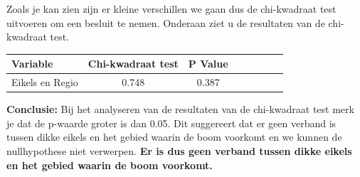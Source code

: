 \documentclass[12pt]{article}
\begin{document}
Zoals je kan zien zijn er  kleine verschillen we gaan dus de chi-kwadraat test uitvoeren om een besluit te nemen.
\newline\newline
Onderaan ziet u de resultaten van de chi-kwadraat test.
\newline\newline
\begin{tabular}{l*{6}{c}r}
    Variable & Chi-kwadraat test & P Value \\
    \hline
    Eikels en Regio & 0.748 & 0.387 \\
\end{tabular}
\newline\newline\newline
\textbf{Conclusie:} Bij het analyseren van de resultaten van de chi-kwadraat test merk je dat de p-waarde groter is dan 0.05.
Dit suggereert dat er geen verband is tussen dikke eikels en het gebied waarin de boom voorkomt en we kunnen de nullhypothese niet verwerpen.
\newline\newline
\textbf{Er is dus geen verband tussen dikke eikels en het gebied waarin de boom voorkomt.}
\end{document}
